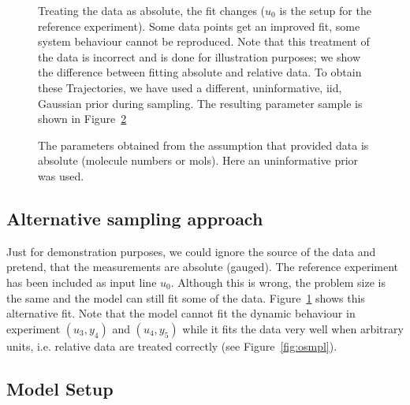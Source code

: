\documentclass[english]{scrartcl}
\begin{document}
\begin{figure}
  \centering
  \hspace*{-3cm}
  \sffamily\tiny
  \caption{Treating the data as absolute, the fit changes ($u_0$ is
    the setup for the reference experiment). Some data points get an
    improved fit, some system behaviour cannot be reproduced. Note
    that this treatment of the data is incorrect and is done for
    illustration purposes; we show the difference between fitting
    absolute and relative data. To obtain these Trajectories, we have
    used a different, uninformative, iid, Gaussian prior during
    sampling. The resulting parameter sample is shown in
    Figure~\ref{fig:AbsoluteSample}}
  \label{fig:AbsoluteFit}
\end{figure}

\begin{figure}
  \centering 
  
  \caption{The parameters obtained from the assumption that provided
    data is absolute (molecule numbers or mols). Here an uninformative
    prior was used.}
  \label{fig:AbsoluteSample}
\end{figure}

\subsection{Alternative sampling approach}

Just for demonstration purposes, we could ignore the source of the
data and pretend, that the measurements are absolute (gauged). The
reference experiment has been included as input line $u_0$. Although
this is wrong, the problem size is the same and the model can still
fit some of the data. Figure~\ref{fig:AbsoluteFit} shows this
alternative fit. Note that the model cannot fit the dynamic behaviour
in experiment $(u_3,y_4)$ and $(u_4,y_5)$ while it fits the data very
well when arbitrary units, i.e. relative data are treated correctly
(see Figure~\ref{fig:osmpl}).

\subsection{Model Setup}
\label{sec:model}

\end{document}

